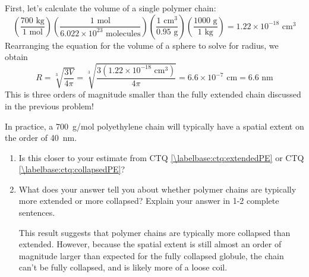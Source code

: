 \begin{activity}
\begin{ctqs}
		\begin{solution}[3.75in]
			First, let's calculate the volume of a single polymer chain:
			\begin{equation*}
				\left(\frac{700\text{ kg}}{1\text{ mol}}\right)
				\left(\frac{1\text{ mol}}{6.022\times10^{23}\text{ molecules}}\right)
				\left(\frac{1\text{ cm}^3}{0.95\text{ g}}\right)
				\left(\frac{1000\text{ g}}{1\text{ kg}}\right)
				= 1.22 \times 10^{-18}\text{ cm}^3
			\end{equation*}
			Rearranging the equation for the volume of a sphere to solve for radius, we obtain
			\begin{equation*}
				R=\sqrt[3]{\frac{3 V}{4\pi}} = \sqrt[3]{\frac{3 \left(1.22 \times 10^{-18}\text{ cm}^3\right)}{4\pi}} = 6.6 \times 10^{-7}\text{ cm} = 6.6\text{ nm}
			\end{equation*}
			This is three orders of magnitude smaller than the fully extended chain discussed in the previous problem!
		\end{solution}
		
	\question In practice, a 700~g/mol polyethylene chain will typically have a spatial extent on the order of 40~nm.  
	
		\begin{enumerate}
			\item Is this closer to your estimate from CTQ \ref{\labelbase:ctq:extendedPE} or CTQ \ref{\labelbase:ctq:collapsedPE}?
			
				\begin{solution}[0.5in]\end{solution}
			
			\item What does your answer tell you about whether polymer chains are typically more extended or more collapsed?  Explain your answer in 1-2 complete sentences.
			
				\begin{solution}[1.75in]
					This result suggests that polymer chains are typically more collapsed than extended.  However, because the spatial extent is still almost an order of magnitude larger than expected for the fully collapsed globule, the chain can't be fully collapsed, and is likely more of a loose coil.
				\end{solution}
			
		\end{enumerate}
		

\end{ctqs}
\end{activity}

